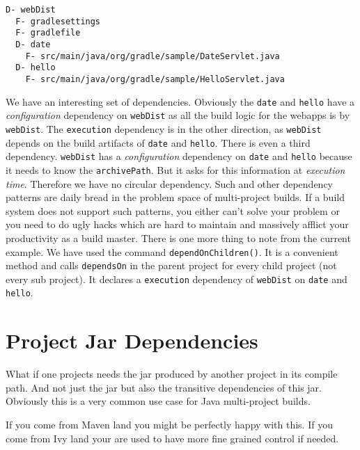 \begin{minipage}[t]{7cm}
\begin{Verbatim}[frame=single,label=Project Tree]
D- webDist
  F- gradlesettings
  F- gradlefile
  D- date
    F- src/main/java/org/gradle/sample/DateServlet.java
  D- hello
    F- src/main/java/org/gradle/sample/HelloServlet.java
\end{Verbatim}
\end{minipage}	
\begin{minipage}[t]{9cm}
\end{minipage}
We have an interesting set of dependencies. Obviously the \texttt{date} and \texttt{hello} have a \emph{configuration} dependency on \texttt{webDist} as all the build logic for the webapps is by \texttt{webDist}. The \texttt{execution} dependency is in the other direction, as \texttt{webDist} depends on the build artifacts of \texttt{date} and \texttt{hello}. There is even a third dependency. \texttt{webDist} has a \emph{configuration} dependency on \texttt{date} and \texttt{hello} because it needs to know the \texttt{archivePath}. But it asks for this information at \emph{execution time}. Therefore we have no circular dependency.
Such and other dependency patterns are daily bread in the problem space of multi-project builds. If a build system does not support such patterns, you either can't solve your problem or you need to do ugly hacks which are hard to maintain and massively afflict your productivity as a build master.
There is one more thing to note from the current example. We have used the command \texttt{dependOnChildren()}. It is a convenient method and calls \texttt{dependsOn} in the parent project for every child project (not every sub project). It declares a \texttt{execution} dependency of \texttt{webDist} on \texttt{date} and \texttt{hello}. 
\section{Project Jar Dependencies} %
\label{sec:project_jar_dependencies}
What if one projects needs the jar produced by another project in its compile path. And not just the jar but also the transitive dependencies of this jar. Obviously this is a very common use case for Java multi-project builds. 

If you come from Maven land you might be perfectly happy with this. If you come from Ivy land your are used to have more fine grained control if needed. 





